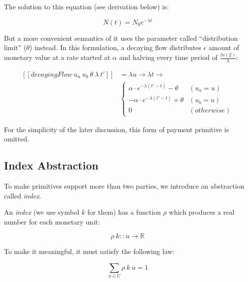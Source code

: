 The solution to this equation (see derivation below) is:

\begin{equation}
    {\displaystyle N(t)=N_{0}e^{-\lambda t}}
\end{equation}

But a more convenient semantics of it uses the parameter called ``distribution limit'' ($\theta$)
instead. In this formulation, a decaying flow distributes $\epsilon$ amount of monetary value at a
rate started at $\alpha$ and halving every time period of $\displaystyle \frac{ln(2)}{\lambda}$:

\begin{equation}
    \begin{split}
        [\![decayingFlow\ u_a\ u_b\ \theta\ \lambda\ t']\!] &=
        \lambda u \rightarrow \lambda t \rightarrow \\
        &\begin{cases}
             {\displaystyle  \alpha \cdot e^{-\lambda (t' - t)} - \theta} & (u_a = u) \\
             {\displaystyle -\alpha \cdot e^{-\lambda (t' - t)} + \theta} & (u_b = u) \\
             0 & (otherwise)
        \end{cases}
    \end{split}
\end{equation}

For the simplicity of the later discussion, this form of payment primitive is omitted.

\subsection{Index Abstraction}

To make primitives support more than two parties, we introduce an abstraction called \textit{index}.

An \textit{index} (we use symbol $k$ for them) has a function $\rho$ which produces a real number for
each monetary unit:

\begin{equation}
    \rho\ k :: u \rightarrow \mathbb{R}
\end{equation}

To make it meaningful, it must satisfy the following law:

\begin{equation}
    \displaystyle \sum_{u \in U} \rho\ k\ u = 1
\end{equation}

